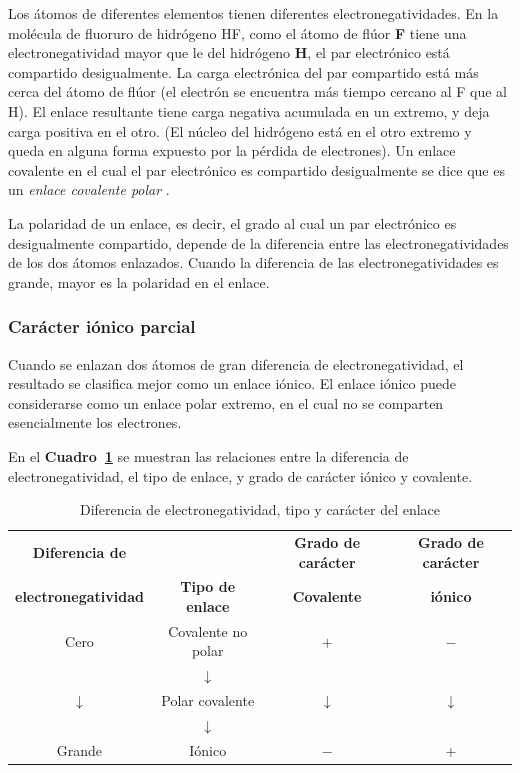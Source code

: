 Los \'atomos de diferentes elementos tienen diferentes electronegatividades. En la
mol\'ecula de fluoruro de hidr\'ogeno HF,  como el \'atomo de fl\'uor \textbf{F} tiene una
electronegatividad mayor que le del hidr\'ogeno \textbf{H}, el par electr\'onico est\'a
compartido desigualmente. La carga electr\'onica del par compartido est\'a m\'as
cerca del \'atomo de fl\'uor (el electr\'on se encuentra m\'as tiempo cercano al F que
al H). El enlace resultante tiene carga negativa acumulada en un extremo, y deja carga
positiva en el otro. (El n\'ucleo del hidr\'ogeno est\'a en el otro extremo y queda
en alguna forma expuesto por la p\'erdida de electrones). Un enlace covalente en el
cual el par electr\'onico es compartido desigualmente se dice que es un
\textit{enlace covalente polar} .

La \gls{polaridad} de un enlace, es decir, el grado al cual un par electr\'onico es desigualmente compartido, depende de la diferencia entre las
electrone\-gatividades de los dos \'atomos enlazados. Cuando la diferencia de las elec\-tro\-ne\-gatividades es grande, mayor es la polaridad en el enlace.

\subsubsection{Car\'acter i\'onico parcial}

 Cuando se enlazan dos \'atomos de gran diferencia de electronegatividad, el resultado se clasifica mejor como un enlace i\'onico. El enlace i\'onico puede considerarse como un enlace polar extremo, en el cual no se comparten esencialmente los electrones.

En el \textbf{Cuadro~\ref{enlace}} se muestran las relaciones entre la diferencia de electronegatividad, el tipo de enlace, y grado de car\'acter i\'onico y covalente.
\begin{table}[thb]
\caption[Electronegatividades y enlaces]{Diferencia de electronegatividad, tipo y
car\'acter del enlace}
\label{enlace}
{\centering \small \begin{tabular}{cccc}\hline
\textbf{Diferencia de}&&\textbf{Grado de car\'acter}&\textbf{Grado de car\'acter}\\
\textbf{electronegatividad}&\textbf{Tipo de enlace}&\textbf{Covalente}& 
\textbf{i\'onico}\\ \hline

Cero &Covalente no polar&$+$ & $-$ \\
   & $\downarrow$ &\\
 $\downarrow$ &Polar covalente&  $\downarrow$ & $\downarrow$ \\
  &  $\downarrow$ & \\
Grande & I\'onico & $-$ & $+$ \\ \hline
\end{tabular}}
\end{table}
